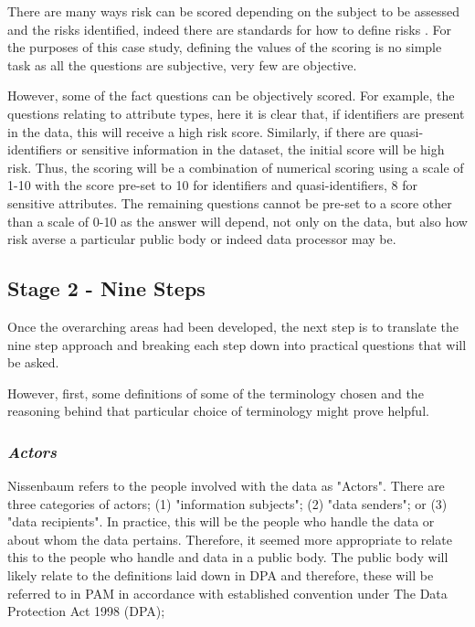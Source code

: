 There are many ways risk can be scored depending on the subject to be assessed and the risks identified, indeed there are standards for how to define risks \citep{Risk_Management2015}. For the purposes of this case study, defining the values of the scoring is no simple task as all the questions are subjective, very few are objective. 

However, some of the fact questions can be objectively scored. For example, the questions relating to attribute types, here it is clear that, if identifiers are present in the data, this will receive a high risk score. Similarly, if there are quasi-identifiers or sensitive information in the dataset, the initial score will be high risk. Thus, the scoring will be a combination of numerical scoring using a scale of 1-10  with the score pre-set to 10 for identifiers and quasi-identifiers, 8 for sensitive attributes. The remaining questions cannot be pre-set to a score other than a scale of 0-10 as the answer will depend, not only on the data, but also how risk averse a particular public body or indeed data processor may be.

\subsection {Stage 2 - Nine Steps}

Once the overarching areas had been developed, the next step is to translate the nine step approach and breaking each step down into practical questions that will be asked.

However, first, some definitions of some of the terminology chosen and the reasoning behind that particular choice of terminology might prove helpful.

\subsubsection {{\it Actors}}
Nissenbaum refers to the people involved with the data as "Actors". There are three categories of actors; (1) "information subjects"; (2) "data senders"; or (3) "data recipients". In practice, this will be the people who handle the data or about whom the data pertains. Therefore, it seemed more appropriate to relate this to the people who handle and data in a public body. The public body will likely relate to the definitions laid down in DPA and therefore, these will be referred to in PAM in accordance with established convention under The Data Protection Act 1998 (DPA); 

